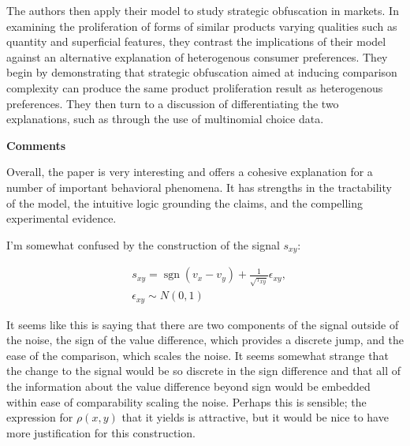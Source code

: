 \documentclass[12pt]{article}
\begin{document}
The authors then apply their model 
to study strategic obfuscation in markets. 
In examining the proliferation of 
forms of similar products varying 
qualities such as quantity and superficial features, 
they
contrast the implications of their model 
against an alternative explanation   
of heterogenous consumer preferences.
They begin by demonstrating that 
strategic obfuscation aimed at inducing 
comparison complexity can produce 
the same product proliferation result
as heterogenous preferences.
They then turn to a discussion of 
differentiating the two explanations, such 
as through the use of multinomial choice data. 



\textbf{Comments}

Overall, the paper is very interesting and 
offers a cohesive explanation 
for a number of important behavioral phenomena.
It has strengths in the tractability
of the model, the intuitive logic 
grounding the claims,
and the compelling experimental evidence.

\hrulefill\hspace{0.5em}\dotfill\hspace{0.5em}\hrulefill

I'm somewhat confused by
the construction of the 
signal $s_{xy}$:

\begin{align}
    & s_{x y}=\operatorname{sgn}\left(v_x-v_y\right)+\frac{1}{\sqrt{\tau_{x y}}} \epsilon_{x y}, \\
    & \epsilon_{x y} \sim N(0,1)
\end{align}

It seems like this is saying that there are 
two components of the signal outside of the noise, 
the sign of the value difference, which provides 
a discrete jump, 
and the ease of the comparison, which scales 
the noise. It seems somewhat strange that 
the change to the signal would be so discrete in the 
sign difference and that all of the information 
about the value difference beyond sign would be 
embedded within ease of comparability scaling the noise.
Perhaps this is sensible; the expression for $\rho(x,y)$
that it yields is attractive, but it would be nice 
to have more justification for this construction.
\end{document}
